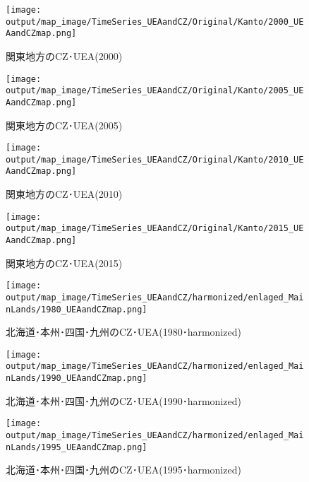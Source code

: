 \documentclass{ltjsarticle}
\begin{document}
\begin{figure}[pbth]
  \centering
  \texttt{[image: output/map\_image/TimeSeries\_UEAandCZ/Original/Kanto/2000\_UEAandCZmap.png]}
  \caption{\label{ori:tsK2000}関東地方のCZ･UEA(2000)}
\end{figure}

\begin{figure}[pbth]
  \centering
  \texttt{[image: output/map\_image/TimeSeries\_UEAandCZ/Original/Kanto/2005\_UEAandCZmap.png]}
  \caption{\label{ori:tsK2005}関東地方のCZ･UEA(2005)}
\end{figure}

\begin{figure}[pbth]
  \centering
  \texttt{[image: output/map\_image/TimeSeries\_UEAandCZ/Original/Kanto/2010\_UEAandCZmap.png]}
  \caption{\label{ori:tsK2010}関東地方のCZ･UEA(2010)}
\end{figure}

\begin{figure}[pbth]
  \centering
  \texttt{[image: output/map\_image/TimeSeries\_UEAandCZ/Original/Kanto/2015\_UEAandCZmap.png]}
  \caption{\label{ori:tsK2015}関東地方のCZ･UEA(2015)}
\end{figure}

  \begin{figure}[pbth]
    \centering
    \texttt{[image: output/map\_image/TimeSeries\_UEAandCZ/harmonized/enlaged\_MainLands/1980\_UEAandCZmap.png]}
    \caption{\label{ham:tsM1980}北海道･本州･四国･九州のCZ･UEA(1980･harmonized)}
  \end{figure}
  
  \begin{figure}[pbth]
    \centering
    \texttt{[image: output/map\_image/TimeSeries\_UEAandCZ/harmonized/enlaged\_MainLands/1990\_UEAandCZmap.png]}
    \caption{\label{ham:tsM1990}北海道･本州･四国･九州のCZ･UEA(1990･harmonized)}
  \end{figure}
  
  \begin{figure}[pbth]
    \centering
    \texttt{[image: output/map\_image/TimeSeries\_UEAandCZ/harmonized/enlaged\_MainLands/1995\_UEAandCZmap.png]}
    \caption{\label{ham:tsM1995}北海道･本州･四国･九州のCZ･UEA(1995･harmonized)}
  \end{figure}
  
\end{document}
